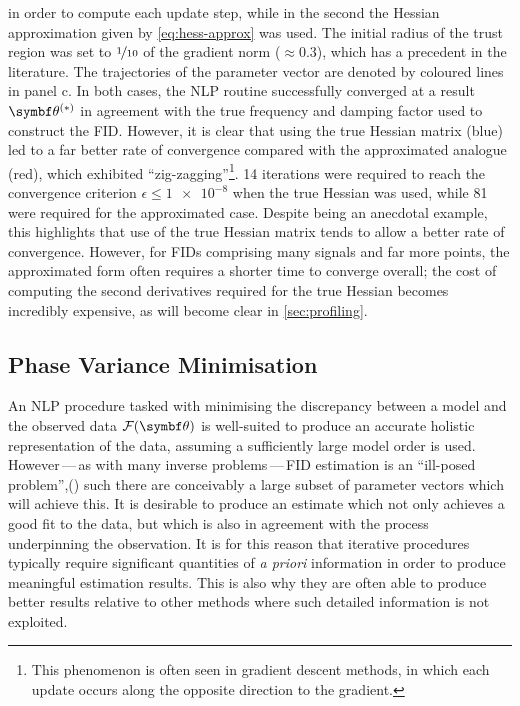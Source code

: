 in order to compute each update step, while in the second the Hessian
approximation given by \cref{eq:hess-approx} was used. The initial
radius of the trust region was set to $\nicefrac{1}{10}$ of the gradient norm
($\approx 0.3$), which has a precedent in the literature\cite{Gould2005}. The
trajectories of the parameter vector are denoted by coloured lines in panel c.
In both cases, the \ac{NLP} routine successfully converged at a result $\bthstar$
in agreement with the true frequency and damping factor used to construct the
\ac{FID}. However, it is clear that using the true Hessian matrix (blue)
led to a far better rate of convergence compared with the
approximated analogue (red), which exhibited ``zig-zagging''\footnote{
    This phenomenon is often seen in gradient descent methods, in which each
    update occurs along the opposite direction to the gradient.
}.
14 iterations were required to reach the
convergence criterion $\epsilon \leq \num[print-unity-mantissa=false]{1e-8}$
when the true Hessian was used, while 81 were required for the approximated
case. Despite being an anecdotal example, this highlights that use of the true
Hessian matrix tends to allow a better rate of convergence. However, for
\acp{FID} comprising many signals and far more points, the approximated form
often requires a shorter time to converge overall; the cost of computing the
second derivatives required for the true Hessian becomes incredibly expensive,
as will become clear in \cref{sec:profiling}.

\subsection{Phase Variance Minimisation}
\label{subsec:phase-variance}
An \ac{NLP} procedure tasked with minimising the discrepancy between a model
and the observed data $\Fth$ is well-suited to produce an accurate holistic
representation of the data, assuming a sufficiently large
model order is used. However\,---\,as with many inverse problems\,---\,\ac{FID}
estimation is an ``ill-posed problem'',() such there
are conceivably a large subset of
parameter vectors which will achieve this. It is desirable to produce an
estimate which not only achieves a good fit to the data, but which is also in
agreement with the process underpinning the observation. It is for this reason
that iterative procedures typically require significant quantities of \textit{a
priori} information in order to produce meaningful estimation results.
This is also why they are often able to
produce better results relative to other methods where such detailed
information is not exploited.

